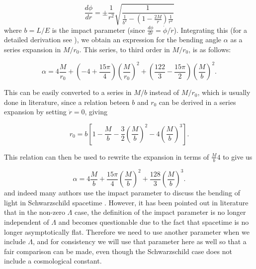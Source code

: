 \begin{equation}
  \frac{d\phi}{dr} = \pm \frac{1}{r^2} \sqrt{\frac{1}{ \frac{1}{b^2} - \left (1- \frac{2M}{r} \right )\frac{1}{r^2} }}
  \label{eq:dphi-dr}
\end{equation}
where $b = L/E$ is the impact parameter (since $\frac{d\phi}{dr} = \dot{\phi}/\dot{r}$). Integrating this (for a detailed derivation see \cite{keeton2005formalism}), we obtain an expression for the bending angle $\alpha$ as a series expansion in $M/r_0$. This series, to third order in $M/r_0$, is as follows:

\begin{equation}
  \alpha = 4 \frac{M}{r_0} + \left ( -4 + \frac{15\pi}{4} \right )\left ( \frac{M}{r_0}\right )^2 + \left ( \frac{122}{3} - \frac{15\pi}{2} \right )\left ( \frac{M}{b}\right )^2.
  \label{eq:lensing-series-expansion-r0}
\end{equation}

This can be easily converted to a series in $M/b$ instead of $M/r_0$, which is usually done in literature, since a relation beteen $b$ and $r_0$ can be derived in a series expansion by setting $\dot{r} = 0$, giving \citep{keeton2005formalism}

\begin{equation}
  r_0 = b \left [ 1 - \frac{M}{b} - \frac{3}{2} \left ( \frac{M}{b}\right)^2 - 4\left ( \frac{M}{b}\right)^3 \right ].
  \label{eq:b-r0-relation}
\end{equation} 

This relation can then be used to rewrite the expansion in terms of $\frac{M}{b}4$ to give us

\begin{equation}
  \alpha = 4 \frac{M}{b} + \frac{15\pi}{4} \left ( \frac{M}{b} \right )^2 + \frac{128}{3} \left ( \frac{M}{b} \right )^3.
  \label{eq:series-expansion-b}
\end{equation}
and indeed many authors use the impact parameter to discuss the bending of light in Schwarzschild spacetime \citep{wald2010general,misner2017gravitation,butcher2016no}. However, it has been pointed out in literature that \citep{ishak2008new,hammad2013note} in the non-zero $\Lambda$ case, the definition of the impact parameter is no longer independent of $\Lambda$ and becomes questionable due to the fact that spacetime is no longer asymptotically flat. Therefore we need to use another parameter when we include $\Lambda$, and for consistency we will use that parameter here as well so that a fair comparison can be made, even though the Schwarzschild case does not include a cosmological constant.

